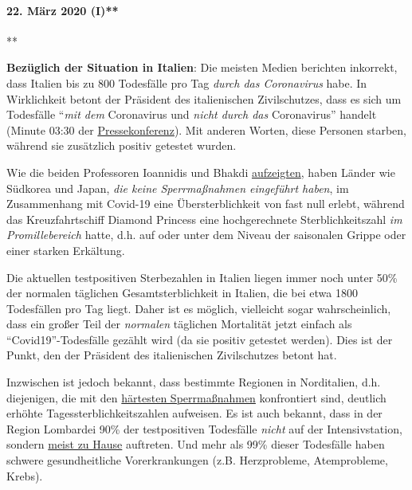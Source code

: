 \hypertarget{22-muxe4rz-2020-i}{%
\paragraph{22. März 2020 (I)**}\label{22-muxe4rz-2020-i}}

**

\textbf{Bezüglich der Situation in Italien}: Die meisten Medien
berichten inkorrekt, dass Italien bis zu 800 Todesfälle pro Tag
\emph{durch das Coronavirus} habe. In Wirklichkeit betont der Präsident
des italienischen Zivilschutzes, dass es sich um Todesfälle ``\emph{mit
dem} Coronavirus und \emph{nicht durch das} Coronavirus'' handelt
(Minute 03:30 der
\href{https://youtu.be/0M4kbPDHGR0?t=210}{Pressekonferenz}). Mit anderen
Worten, diese Personen starben, während sie zusätzlich positiv getestet
wurden.

Wie die beiden Professoren Ioannidis und Bhakdi
\href{https://www.statnews.com/2020/03/17/a-fiasco-in-the-making-as-the-coronavirus-pandemic-takes-hold-we-are-making-decisions-without-reliable-data/}{aufzeigten},
haben Länder wie Südkorea und Japan, \emph{die keine Sperrmaßnahmen
eingeführt haben}, im Zusammenhang mit Covid-19 eine Übersterblichkeit
von fast null erlebt, während das Kreuzfahrtschiff Diamond Princess eine
hochgerechnete Sterblichkeitszahl \emph{im Promillebereich} hatte, d.h.
auf oder unter dem Niveau der saisonalen Grippe oder einer starken
Erkältung.

Die aktuellen testpositiven Sterbezahlen in Italien liegen immer noch
unter 50\% der normalen täglichen Gesamtsterblichkeit in Italien, die
bei etwa 1800 Todesfällen pro Tag liegt. Daher ist es möglich,
vielleicht sogar wahrscheinlich, dass ein großer Teil der
\emph{normalen} täglichen Mortalität jetzt einfach als
``Covid19''-Todesfälle gezählt wird (da sie positiv getestet werden).
Dies ist der Punkt, den der Präsident des italienischen Zivilschutzes
betont hat.

Inzwischen ist jedoch bekannt, dass bestimmte Regionen in Norditalien,
d.h. diejenigen, die mit den
\href{https://en.wikipedia.org/wiki/2020_Italy_coronavirus_lockdown}{härtesten
Sperrmaßnahmen} konfrontiert sind, deutlich erhöhte
Tages­sterb­lichkeits­zahlen aufweisen. Es ist auch bekannt, dass in der
Region Lombardei 90\% der testpositiven Todesfälle \emph{nicht} auf der
Intensivstation, sondern
\href{https://www.tgcom24.mediaset.it/cronaca/coronavirus-in-lombardia-9-morti-su-10-mai-giunti-in-terapia-intensiva_16362350-202002a.shtml}{meist
zu Hause} auftreten. Und mehr als 99\% dieser Todesfälle haben schwere
gesundheitliche Vorerkrankungen (z.B. Herzprobleme, Atemprobleme,
Krebs).

